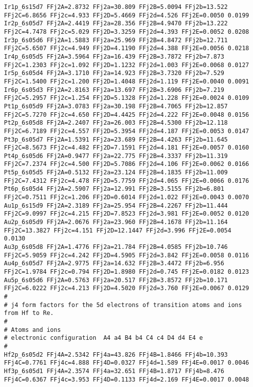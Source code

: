 {\begin{verbatim}
Ir1p_6s15d7 FFj2A=2.8732 FFj2a=30.809 FFj2B=5.0094 FFj2b=13.522 FFj2C=6.8656 FFj2c=4.933 FFj2D=5.4669 FFj2d=4.526 FFj2E=0.0050 0.0199 
Ir2p_6s05d7 FFj2A=2.4419 FFj2a=28.356 FFj2B=4.9470 FFj2b=13.222 FFj2C=4.7478 FFj2c=5.029 FFj2D=3.3259 FFj2d=4.393 FFj2E=0.0052 0.0208 
Ir3p_6s05d6 FFj2A=1.5883 FFj2a=25.969 FFj2B=4.8472 FFj2b=12.711 FFj2C=5.6507 FFj2c=4.949 FFj2D=4.1190 FFj2d=4.388 FFj2E=0.0056 0.0218 
Ir4p_6s05d5 FFj2A=3.5964 FFj2a=16.439 FFj2B=3.7872 FFj2b=7.873 FFj2C=1.2303 FFj2c=1.092 FFj2D=1.1232 FFj2d=1.003 FFj2E=0.0068 0.0127 
Ir5p_6s05d4 FFj2A=3.1710 FFj2a=14.923 FFj2B=3.7320 FFj2b=7.529 FFj2C=1.5400 FFj2c=1.200 FFj2D=1.4048 FFj2d=1.119 FFj2E=0.0040 0.0091 
Ir6p_6s05d3 FFj2A=2.8163 FFj2a=13.697 FFj2B=3.6906 FFj2b=7.219 FFj2C=5.2957 FFj2c=1.254 FFj2D=5.1328 FFj2d=1.228 FFj2E=0.0024 0.0109 
Pt1p_6s05d9 FFj2A=3.0783 FFj2a=30.198 FFj2B=4.7065 FFj2b=12.857 FFj2C=5.7270 FFj2c=4.650 FFj2D=4.4425 FFj2d=4.222 FFj2E=0.0048 0.0156 
Pt2p_6s05d8 FFj2A=2.2407 FFj2a=26.003 FFj2B=4.5300 FFj2b=12.118 FFj2C=6.7189 FFj2c=4.557 FFj2D=5.3954 FFj2d=4.187 FFj2E=0.0053 0.0147 
Pt3p_6s05d7 FFj2A=1.5391 FFj2a=23.689 FFj2B=4.4263 FFj2b=11.645 FFj2C=8.5673 FFj2c=4.482 FFj2D=7.1591 FFj2d=4.181 FFj2E=0.0057 0.0160 
Pt4p_6s05d6 FFj2A=0.9477 FFj2a=22.775 FFj2B=4.3337 FFj2b=11.319 FFj2C=7.2374 FFj2c=4.500 FFj2D=5.7086 FFj2d=4.106 FFj2E=0.0062 0.0166 
Pt5p_6s05d5 FFj2A=0.5132 FFj2a=23.124 FFj2B=4.1835 FFj2b=11.009 FFj2C=7.4312 FFj2c=4.478 FFj2D=5.7759 FFj2d=4.065 FFj2E=0.0066 0.0176 
Pt6p_6s05d4 FFj2A=2.5907 FFj2a=12.991 FFj2B=3.5155 FFj2b=6.801 FFj2C=0.7511 FFj2c=1.206 FFj2D=0.6014 FFj2d=1.022 FFj2E=0.0043 0.0070 
Au1p_6s15d9 FFj2A=2.3189 FFj2a=25.954 FFj2B=4.2267 FFj2b=11.444 FFj2C=9.0997 FFj2c=4.215 FFj2D=7.8523 FFj2d=3.981 FFj2E=0.0052 0.0120 
Au2p_6s05d9 FFj2A=2.0676 FFj2a=23.960 FFj2B=4.1678 FFj2b=11.164 FFj2C=13.3827 FFj2c=4.151 FFj2D=12.1447 FFj2d=3.996 FFj2E=0.0054 0.0130 
Au3p_6s05d8 FFj2A=1.4776 FFj2a=21.784 FFj2B=4.0585 FFj2b=10.746 FFj2C=5.9059 FFj2c=4.242 FFj2D=4.5905 FFj2d=3.842 FFj2E=0.0058 0.0116 
Au4p_6s05d7 FFj2A=2.9775 FFj2a=14.632 FFj2B=3.4472 FFj2b=6.956 FFj2C=1.9784 FFj2c=0.794 FFj2D=1.8980 FFj2d=0.745 FFj2E=0.0182 0.0123 
Au5p_6s05d6 FFj2A=0.5763 FFj2a=20.517 FFj2B=3.8572 FFj2b=10.171 FFj2C=6.0222 FFj2c=4.213 FFj2D=4.5020 FFj2d=3.760 FFj2E=0.0067 0.0129 
#
# j4 form factors for the 5d electrons of transition atoms and ions from Hf to Re.
#
# Atoms and ions
# electronic configuration  A4 a4 B4 b4 C4 c4 D4 d4 E4 e
#
Hf2p_6s05d2 FFj4A=2.5342 FFj4a=43.826 FFj4B=1.8466 FFj4b=10.393 FFj4C=0.7761 FFj4c=4.888 FFj4D=0.0327 FFj4d=1.589 FFj4E=0.0017 0.0046 
Hf3p_6s05d1 FFj4A=2.3574 FFj4a=32.651 FFj4B=1.8717 FFj4b=8.476 FFj4C=0.6367 FFj4c=3.953 FFj4D=0.1133 FFj4d=2.169 FFj4E=0.0017 0.0048 

\end{verbatim}}
